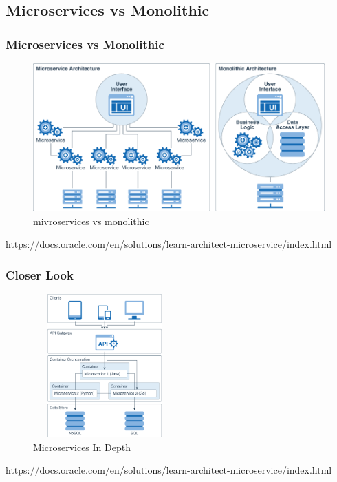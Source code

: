 \documentclass{beamer}
\begin{document}
	\subsection {Microservices vs Monolithic}
		\begin{frame}
			\frametitle{Microservices vs Monolithic}
				\begin{figure}[h]
					\includegraphics[width=0.8\linewidth]{img/monolithic_vs_microservice.png}
					\caption{mivroservices vs monolithic}
				\end{figure}
				
				
				\tiny{https://docs.oracle.com/en/solutions/learn-architect-microservice/index.html}		
		\end{frame}

		\begin{frame}
			\frametitle{Closer Look}
				\begin{figure}[h]
					\includegraphics[width=55mm, height=55mm, scale=1]{img/microservice_architecture.png}
					\caption{Microservices In Depth}
				\end{figure}
				
				
				\tiny{https://docs.oracle.com/en/solutions/learn-architect-microservice/index.html}	
		\end{frame}
	
\end{document}
